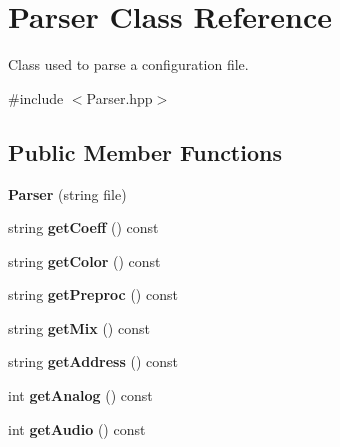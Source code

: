 \hypertarget{class_parser}{}\section{Parser Class Reference}
\label{class_parser}


Class used to parse a configuration file.  




{\ttfamily \#include $<$Parser.\+hpp$>$}

\subsection*{Public Member Functions}
\begin{DoxyCompactItemize}
\item 
\mbox{\label{class_parser_a6f69ecc6d4769f182dfcbda65c930dd8}} 
{\bfseries Parser} (string file)
\item 
\mbox{\label{class_parser_ae7353b7235ffac4cf9545edb72f48bd2}} 
string {\bfseries get\+Coeff} () const
\item 
\mbox{\label{class_parser_a7c9bbd66514c40e16f1435b752c9897d}} 
string {\bfseries get\+Color} () const
\item 
\mbox{\label{class_parser_a7697bd8ae952e93657b86d96cf82ecff}} 
string {\bfseries get\+Preproc} () const
\item 
\mbox{\label{class_parser_a843ac9cac51e1cf6189bef92c08a5d11}} 
string {\bfseries get\+Mix} () const
\item 
\mbox{\label{class_parser_a054fd84994da1fc7de6011ea42d0a95e}} 
string {\bfseries get\+Address} () const
\item 
\mbox{\label{class_parser_a6f55d9be218ee7a25012027e8737864a}} 
int {\bfseries get\+Analog} () const
\item 
\mbox{\label{class_parser_a018a702af5c2e9e3b6727f7c887d73b0}} 
int {\bfseries get\+Audio} () const
\item 
\mbox{\label{class_parser_a3d59e03702bdd6cf8f6b58f73f5ea0eb}} 

\end{DoxyCompactItemize}
